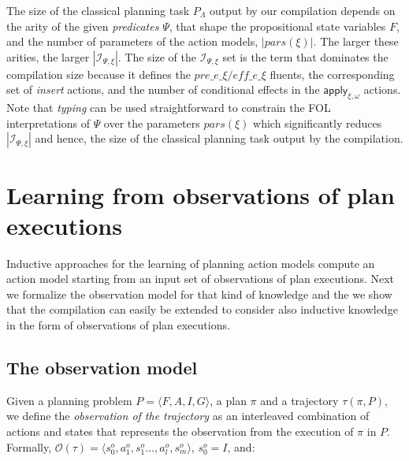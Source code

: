 \documentclass{article}
\newcommand{\tup}[1]{{\langle #1 \rangle}}
\begin{document}
The size of the classical planning task $P_{\Lambda}$ output by our compilation depends on the arity of the given {\em predicates} $\Psi$, that shape the propositional state variables $F$, and the number of parameters of the action models, $|pars(\xi)|$. The larger these arities, the larger $|{\mathcal I}_{\Psi,\xi}|$. The size of the ${\mathcal I}_{\Psi,\xi}$ set is the term that dominates the compilation size because it defines the $pre\_e\_\xi/eff\_e\_\xi$ fluents, the corresponding set of {\em insert} actions, and the number of conditional effects in the $\mathsf{apply_{\xi,\omega}}$ actions. Note that {\em typing} can be used straightforward to constrain the FOL interpretations of $\Psi$ over the parameters $pars(\xi)$ which significantly reduces $|{\mathcal I}_{\Psi,\xi}|$ and hence, the size of the classical planning task output by the compilation.


\section{Learning from observations of plan executions}
\label{sec:observations}
Inductive approaches for the learning of planning action models compute an action model starting from an input set of observations of plan executions. Next we formalize the observation model for that kind of knowledge and the we show that the compilation can easily be extended to consider also inductive knowledge in the form of observations of plan executions.

\subsection{The observation model}
Given a planning problem $P=\tup{F,A,I,G}$, a plan $\pi$ and a trajectory $\tau(\pi,P)$, we define the \emph{observation of the trajectory} as an interleaved combination of actions and states that represents the observation from the execution of $\pi$ in $P$. Formally, $\mathcal{O}(\tau)=\tup{s_0^o,a_1^o,s_1^o \ldots , a_l^o, s_m^o}$, $s_0^o=I$, and:
\end{document}
